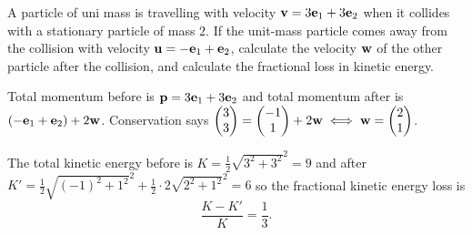 \documentclass[10pt, a4paper]{article}
\begin{document}
\begin{example}
    A particle of uni mass is travelling with velocity $\mathbf{v} = 3\mathbf{e}_1 + 3\mathbf{e}_2$ when it collides with a stationary particle of mass $2$.
    If the unit-mass particle comes away from the collision with velocity $\mathbf{u} = -\mathbf{e}_1 + \mathbf{e}_2$,
    calculate the velocity $\mathbf{w}$ of the other particle after the collision,
    and calculate the fractional loss in kinetic energy.

    \begin{solution}
        Total momentum before is $\mathbf{p} = 3\mathbf{e}_1 + 3\mathbf{e}_2$ and total momentum after is $(-\mathbf{e}_1 + \mathbf{e}_2) + 2\mathbf{w}$.
        Conservation says
        $\begin{pmatrix}
            3 \\ 3
        \end{pmatrix} = \begin{pmatrix}
            -1 \\ 1
        \end{pmatrix} + 2\mathbf{w} \iff \mathbf{w} = \begin{pmatrix}
            2 \\ 1
        \end{pmatrix}$.

        The total kinetic energy before is $K = \frac{1}{2}\sqrt{3 ^ 2 + 3 ^ 2} ^ 2 = 9$ and after $K' = \frac{1}{2}\sqrt{(-1) ^ 2 + 1 ^ 2} ^ 2 + \frac{1}{2}\cdot 2\sqrt{2 ^ 2 + 1 ^ 2} ^ 2 = 6$ so the fractional kinetic energy loss is
        \[
        \frac{K - K'}{K} = \frac{1}{3}.
        \]
    \end{solution}
\end{example}
\end{document}
